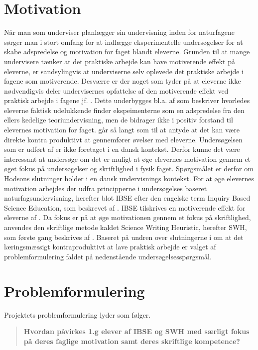 \section{Motivation}
\label{sec:1.1}
Når man som underviser planlægger sin undervisning inden for naturfagene sørger man i stort omfang for at indlægge eksperimentelle undersøgelser for at skabe adspredelse og motivation for faget blandt eleverne. Grunden til at mange undervisere tænker at det praktiske arbejde kan have motiverende effekt på eleverne, er sandsylingvis at underviserne selv oplevede det praktiske arbejde i fagene som motiverende. Desværre er der noget som tyder på at eleverne ikke nødvendigvis deler undervisernes opfattelse af den motiverende effekt ved praktisk arbejde i fagene jf. \citep[s. 65 - 69]{Krogh2016}. 
Dette underbygges bl.a. af \citet{Hodson2008} som beskriver hvorledes eleverne faktisk udelukkende finder ekspeimenterne som en adspredelse fra den ellers kedelige teoriundervisning, men de bidrager ikke i positiv forstand til elevernes motivation for faget.  \citet[]{Hodson2008} går så langt som til at antyde at det kan være direkte kontra produktivt at gennemfører øvelser med eleverne. 
Undersøgelsen som er udført af \citet{Hodson2008} er ikke foretaget i en dansk kontekst. Derfor kunne det være interessant at undersøge om det er muligt at øge elevernes motivation gennem et øget fokus på undersøgelser og skriftlighed i fysik faget. Spørgsmålet er derfor om Hodsons slutninger holder i en dansk undervisnings kontekst. For at øge elevernes motivation arbejdes der udfra principperne i undersøgelses baseret naturfagsundervisning, herefter blot IBSE\def\ib{IBSE} efter den engelske term Inquiry Based Science Education, som beskrevet af \citep{Dolin2014}. \ib{} tilskrives en motiverende effekt for eleverne af \citep{Krogh2016, Dolin2014}. Da fokus er på at øge motivationen gennem et fokus på skriftlighed, anvendes den skriftlige metode kaldet Science Writing Heuristic, herefter SWH\def\sw{SWH}, som første gang beskrives af \citep{Keys1999}. Baseret på undren over slutningerne i \citep{Hodson2008} om at det læringsmæssigt kontraproduktivt at lave praktisk arbejde er valget af problemformulering faldet på nedenstående undersøgelsesspørgsmål.

\section{Problemformulering}
\label{sec:1.2}
Projektets problemformulering lyder som følger.
\begin{quote}
	{\bfseries Hvordan påvirkes 1.g elever af IBSE og SWH med særligt fokus på deres faglige motivation samt deres skriftlige kompetence?}
\end{quote}

